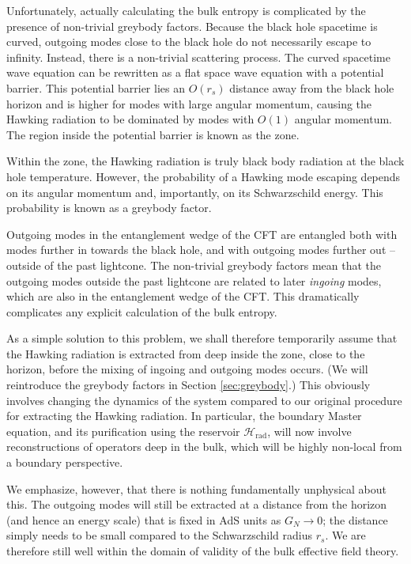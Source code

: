 \documentclass[11pt,a4paper]{article}
\begin{document}
Unfortunately, actually calculating the bulk entropy is complicated by the presence of non-trivial greybody factors. Because the black hole spacetime is curved, outgoing modes close to the black hole do not necessarily escape to infinity. Instead, there is a non-trivial scattering process. The curved spacetime wave equation can be rewritten as a flat space wave equation with a potential barrier. This potential barrier lies an $O(r_s)$ distance away from the black hole horizon and is higher for modes with large angular momentum, causing the Hawking radiation to be dominated by modes with $O(1)$ angular momentum. The region inside the potential barrier is known as the zone.

Within the zone, the Hawking radiation is truly black body radiation at the black hole temperature. However, the probability of a Hawking mode escaping depends on its angular momentum and, importantly, on its Schwarzschild energy. This probability is known as a greybody factor. 

Outgoing modes in the entanglement wedge of the CFT are entangled both with modes further in towards the black hole, and with outgoing modes further out -- outside of the past lightcone. The non-trivial greybody factors mean that the outgoing modes outside the past lightcone are related to later \emph{ingoing} modes, which are also in the entanglement wedge of the CFT. This dramatically complicates any explicit calculation of the bulk entropy.

As a simple solution to this problem, we shall therefore temporarily assume that the Hawking radiation is extracted from deep inside the zone, close to the horizon, before the mixing of ingoing and outgoing modes occurs. (We will reintroduce the greybody factors in Section \ref{sec:greybody}.) This obviously involves changing the dynamics of the system compared to our original procedure for extracting the Hawking radiation. In particular, the boundary Master equation, and its purification using the reservoir $\mathcal{H}_\text{rad}$, will now involve reconstructions of operators deep in the bulk, which will be highly non-local from a boundary perspective. 

We emphasize, however, that there is nothing fundamentally unphysical about this. The outgoing modes will still be extracted at a distance from the horizon (and hence an energy scale) that is fixed in AdS units as $G_N \to 0$; the distance simply needs to be small compared to the Schwarzschild radius $r_s$. We are therefore still well within the domain of validity of the bulk effective field theory.
\end{document}
